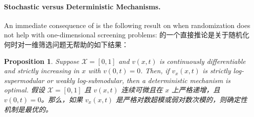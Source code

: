 \documentclass[12pt,letterpaper]{article}
\newenvironment{original}{\color{black}\noindent}{}
\newenvironment{translation}{\color{blue}\noindent}{}
\theoremstyle{plain}
\newtheorem{prop}{Proposition}
\theoremstyle{definition}
\theoremstyle{remark}
\renewcommand{\1}{\mathds{1}}
\theoremstyle{definition}
\begin{document}
\paragraph{Stochastic versus Deterministic Mechanisms.}\hspace{-2mm}\begin{original}An immediate consequence of  is the following result on when randomization does not help with one-dimensional screening problems:
\end{original}
\begin{translation}
的一个直接推论是关于随机化何时对一维筛选问题无帮助的如下结果：
\end{translation}

\begin{prop}\label{prop:stochastic}
\begin{original}
Suppose $\mathcal{X} = [0, 1]$ and $v(x, t)$ is continuously differentiable and strictly increasing in $x$ with $v(0, t) = 0$. Then, if $v_x(x, t)$ is \emph{strictly log-supermodular} or \emph{weakly log-submodular}, then a deterministic mechanism is optimal.
\end{original}
\begin{translation}
假设 $\mathcal{X} = [0, 1]$ 且 $v(x, t)$ 连续可微且在 $x$ 上严格递增，且 $v(0, t) = 0$。那么，如果 $v_x(x, t)$ 是\emph{严格对数超模}或\emph{弱对数次模}的，则确定性机制是最优的。
\end{translation}
\end{prop}
\end{document}
